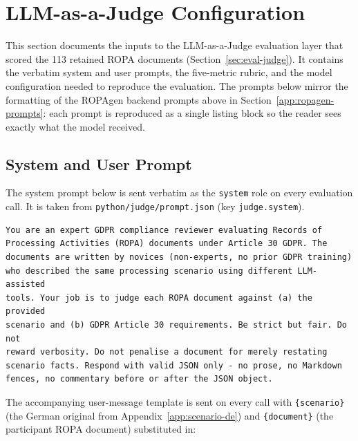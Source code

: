 \section{LLM-as-a-Judge Configuration}
\label{app:judge}

This section documents the inputs to the LLM-as-a-Judge evaluation layer that scored the 113 retained ROPA documents (Section~\ref{sec:eval-judge}). It contains the verbatim system and user prompts, the five-metric rubric, and the model configuration needed to reproduce the evaluation. The prompts below mirror the formatting of the ROPAgen backend prompts above in Section~\ref{app:ropagen-prompts}: each prompt is reproduced as a single listing block so the reader sees exactly what the model received.

\subsection{System and User Prompt}
\label{app:judge-prompt}

The system prompt below is sent verbatim as the \texttt{system} role on every evaluation call. It is taken from \texttt{python/judge/prompt.json} (key \texttt{judge.system}).

\begin{lstlisting}
You are an expert GDPR compliance reviewer evaluating Records of
Processing Activities (ROPA) documents under Article 30 GDPR. The
documents are written by novices (non-experts, no prior GDPR training)
who described the same processing scenario using different LLM-assisted
tools. Your job is to judge each ROPA document against (a) the provided
scenario and (b) GDPR Article 30 requirements. Be strict but fair. Do not
reward verbosity. Do not penalise a document for merely restating
scenario facts. Respond with valid JSON only - no prose, no Markdown
fences, no commentary before or after the JSON object.
\end{lstlisting}

The accompanying user-message template is sent on every call with \texttt{\{scenario\}} (the German original from Appendix~\ref{app:scenario-de}) and \texttt{\{document\}} (the participant ROPA document) substituted in:

